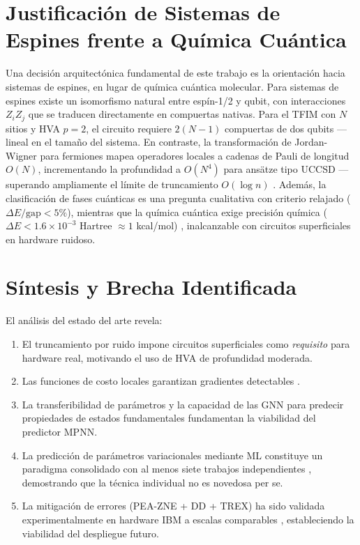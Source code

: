 \documentclass[11pt,a4paper,spanish]{book}
\begin{document}
\section{Justificación de Sistemas de Espines frente a Química Cuántica}

Una decisión arquitectónica fundamental de este trabajo es la orientación hacia sistemas de espines, en lugar de química cuántica molecular. Para sistemas de espines existe un isomorfismo natural entre espín-1/2 y qubit, con interacciones $Z_i Z_j$ que se traducen directamente en compuertas nativas. Para el TFIM con $N$ sitios y HVA $p = 2$, el circuito requiere $2(N-1)$ compuertas de dos qubits ---lineal en el tamaño del sistema. En contraste, la transformación de Jordan-Wigner para fermiones mapea operadores locales a cadenas de Pauli de longitud $O(N)$, incrementando la profundidad a $O(N^4)$ para ansätze tipo UCCSD \citep{tilly2022} ---superando ampliamente el límite de truncamiento $O(\log n)$ \citep{mele2026}. Además, la clasificación de fases cuánticas es una pregunta cualitativa con criterio relajado ($\Delta E/\text{gap} < 5\%$), mientras que la química cuántica exige precisión química ($\Delta E < 1.6 \times 10^{-3}$ Hartree $\approx 1$ kcal/mol) \citep{tilly2022}, inalcanzable con circuitos superficiales en hardware ruidoso.

\section{Síntesis y Brecha Identificada}

El análisis del estado del arte revela:

\begin{enumerate}
    \item El truncamiento por ruido \citep{mele2026} impone circuitos superficiales como \emph{requisito} para hardware real, motivando el uso de HVA de profundidad moderada.
    \item Las funciones de costo locales garantizan gradientes detectables \citep{cerezo2021}.
    \item La transferibilidad de parámetros \citep{mele2022, puig2025} y la capacidad de las GNN para predecir propiedades de estados fundamentales \citep{huang2022, zhang2025} fundamentan la viabilidad del predictor MPNN.
    \item La predicción de parámetros variacionales mediante ML constituye un paradigma consolidado con al menos siete trabajos independientes \citep{miao2024, zhang2025, zou2026, yang2024pvls, zhang2025vqezy, huang2025palqo, karim2025}, demostrando que la técnica individual no es novedosa per se.
    \item La mitigación de errores (PEA-ZNE + DD + TREX) ha sido validada experimentalmente en hardware IBM a escalas comparables \citep{kim2023, kiiamov2026, sharma2026}, estableciendo la viabilidad del despliegue futuro.
\end{enumerate}
\end{document}
